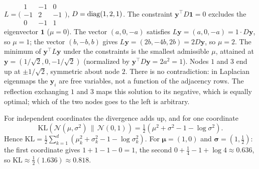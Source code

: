 $L = \bigl(\begin{smallmatrix}1&-1&0\\-1&2&-1\\0&-1&1\end{smallmatrix}\bigr)$, $D = \operatorname{diag}(1,2,1)$. The constraint $\bm y^\top D\mathbf 1 = 0$ excludes the eigenvector $\mathbf 1$ ($\mu = 0$). The vector $(a, 0, -a)$ satisfies $L\bm y = (a, 0, -a) = 1\cdot D\bm y$, so $\mu = 1$; the vector $(b, -b, b)$ gives $L\bm y = (2b, -4b, 2b) = 2D\bm y$, so $\mu = 2$. The minimum of $\bm y^\top L\bm y$ under the constraints is the smallest admissible $\mu$, attained at $\bm y = (1/\sqrt2, 0, -1/\sqrt2)$ (normalized by $\bm y^\top D\bm y = 2a^2 = 1$). Nodes $1$ and $3$ end up at $\pm1/\sqrt2$, symmetric about node $2$. There is no contradiction: in Laplacian eigenmaps the $\bm y_i$ are free variables, not a function of the adjacency rows. The reflection exchanging $1$ and $3$ maps this solution to its negative, which is equally optimal; which of the two nodes goes to the left is arbitrary.

For independent coordinates the divergence adds up, and for one coordinate
\[
\mathrm{KL}(\mathcal N(\mu,\sigma^2)\,\|\,\mathcal N(0,1)) = \tfrac12(\mu^2 + \sigma^2 - 1 - \log\sigma^2).
\] Hence $\mathrm{KL} = \frac12\sum_{k=1}^d(\mu_k^2 + \sigma_k^2 - 1 - \log\sigma_k^2)$. For $\boldsymbol\mu = (1, 0)$ and $\boldsymbol\sigma = (1, \frac12)$: the first coordinate gives $1 + 1 - 1 - 0 = 1$, the second $0 + \frac14 - 1 + \log4 \approx 0.636$, so $\mathrm{KL} \approx \frac12(1.636) \approx 0.818$.
